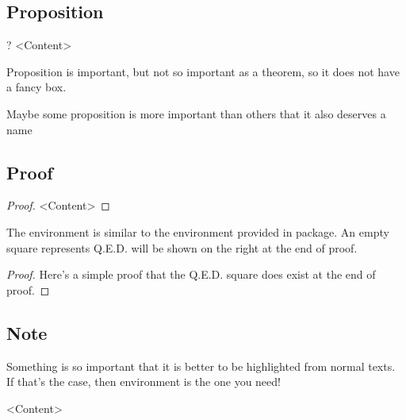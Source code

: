 \documentclass{article}
\begin{document}
\subsection{Proposition}

\begin{codeblock}[tex]
\begin{proposition}?
    <Content>
\end{proposition}
\end{codeblock}

\begin{proposition}
    Proposition is important, but not so important as a theorem, so it does not have a fancy box.
\end{proposition}

\begin{proposition}
    Maybe some proposition is more important than others that it also deserves a name
\end{proposition}

\subsection{Proof}

\begin{codeblock}[tex]
\begin{proof}
    <Content>
\end{proof}
\end{codeblock}

    The  environment is similar to the  environment provided in  package. An empty square represents Q.E.D. will be shown on the right at the end of proof.

    \begin{proof}
        Here's a simple proof that the Q.E.D. square does exist at the end of proof.

    \end{proof}

    \subsection{Note}

    Something is so important that it is better to be highlighted from normal texts. If that's the case, then  environment is the one you need!

\begin{codeblock}[tex]
\begin{note}
    <Content>
\end{note}
\end{codeblock}
\end{document}
